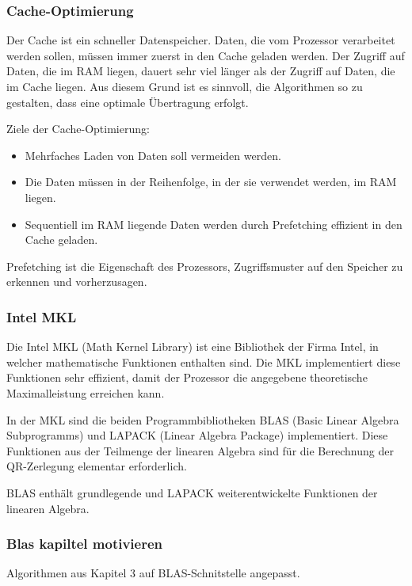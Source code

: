 \subsubsection{Cache-Optimierung}
Der Cache ist ein schneller Datenspeicher. Daten, die vom Prozessor verarbeitet werden sollen, müssen immer zuerst in den Cache geladen werden.
Der Zugriff auf Daten, die im RAM liegen, dauert sehr viel länger als der Zugriff auf Daten, die im Cache liegen.
Aus diesem Grund ist es sinnvoll, die Algorithmen so zu gestalten, dass eine optimale Übertragung erfolgt.

Ziele der Cache-Optimierung:
\begin{itemize}
	\item Mehrfaches Laden von Daten soll vermeiden werden.
	\item Die Daten müssen in der Reihenfolge, in der sie verwendet werden, im RAM liegen.
	\item Sequentiell im RAM liegende Daten werden durch Prefetching effizient in den Cache geladen.
\end{itemize}

Prefetching ist die Eigenschaft des Prozessors, Zugriffsmuster auf den Speicher zu erkennen und vorherzusagen.	

\subsubsection{Intel MKL}
Die Intel MKL (Math Kernel Library) \cite{mkl} ist eine Bibliothek der Firma Intel, in welcher mathematische Funktionen enthalten sind.
Die MKL implementiert diese Funktionen sehr effizient, damit der Prozessor die angegebene theoretische Maximalleistung erreichen kann.



In der MKL sind die beiden Programmbibliotheken BLAS (Basic Linear Algebra Subprogramms) und LAPACK (Linear Algebra Package) implementiert. 
Diese Funktionen aus der Teilmenge der linearen Algebra sind für die Berechnung der QR-Zerlegung elementar erforderlich.

BLAS enthält grundlegende und LAPACK weiterentwickelte Funktionen der linearen Algebra.

\subsubsection{Blas kapiltel motivieren}
Algorithmen aus Kapitel 3 auf BLAS-Schnitstelle angepasst.








